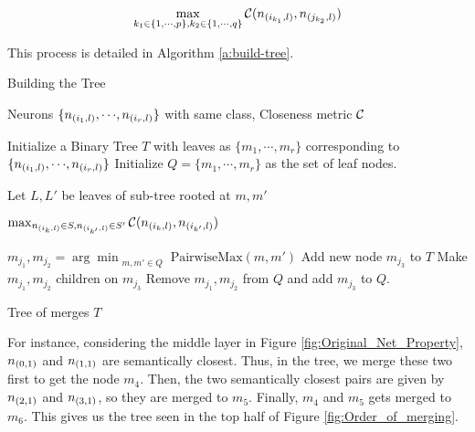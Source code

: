 \begin{equation*}
\begin{aligned}
    \max_{k_1 \in \{1, {\cdots}, p\},
    k_2 \in \{1, {\cdots}, q\}} \mathcal{C}( n_{(i_{k_1},l)}, n_{(j_{k_2},l)} )
\end{aligned}
\end{equation*}


This process is detailed in Algorithm \ref{a:build-tree}.

\begin{algorithm}
\caption{Building the Tree}
\label{a:build-tree}
\begin{algorithmic}[1]

    \Require Neurons $\{n_{(i_1,l)}, {\cdots}, n_{(i_r,l)}\}$ with same class,
    Closeness metric $\mathcal{C}$

    
    \State Initialize a Binary Tree $T$ with leaves as
        $\{m_1, {\cdots}, m_r\}$ corresponding to $\{ n_{(i_1,l)}, {\cdots},
        n_{(i_r,l)} \}$
    \State Initialize $Q=\{m_1, {\cdots}, m_r\}$ as the set of leaf nodes.

        
            \State Let $L, L'$ be leaves of sub-tree rooted at $m, m'$

            \Return $\max_{n_{(i_{k},l)} \in S, n_{(i_{k'},l)} \in S'} 
                \mathcal{C}( n_{(i_{k},l)}, n_{(i_{k'},l)} )$

    \EndFunction

        \State $m_{j_1}, m_{j_2} = \arg\min_{\substack{m, m' \in Q}} 
            \text{PairwiseMax}(m, m')$
        \State Add new node $m_{j_3}$ to $T$ 
        \State Make $m_{j_1}, m_{j_2}$ children on $m_{j_3}$
        \State Remove $m_{j_1}, m_{j_2}$ from $Q$ and add $m_{j_3}$ to $Q$.
    \EndWhile

    \Ensure Tree of merges $T$
\end{algorithmic}
\end{algorithm}

For instance, considering the middle layer in Figure
\ref{fig:Original_Net_Property}, $n_{(0,1)}$ and $n_{(1,1)}$ are semantically
closest. Thus, in the tree, we merge these two first to get the node $m_4$.
Then, the two semantically closest pairs are given by $n_{(2,1)}$ and
$n_{(3,1)}$, so they are merged to $m_5$. Finally, $m_4$ and $m_5$ gets merged
to $m_6$. This gives us the tree seen in the top half of Figure
\ref{fig:Order_of_merging}.

